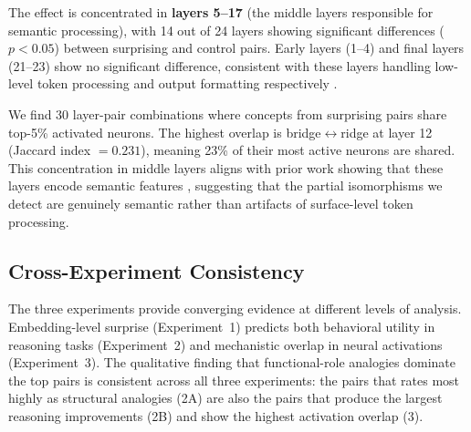 The effect is concentrated in \textbf{layers 5--17} (the middle layers responsible for semantic processing), with 14 out of 24 layers showing significant differences ($p < 0.05$) between surprising and control pairs.
Early layers (1--4) and final layers (21--23) show no significant difference, consistent with these layers handling low-level token processing and output formatting respectively \citep{gurnee2023finding}.

We find 30 layer-pair combinations where concepts from surprising pairs share top-5\% activated neurons.
The highest overlap is bridge$\leftrightarrow$ridge at layer 12 (Jaccard index $= 0.231$), meaning 23\% of their most active neurons are shared.
This concentration in middle layers aligns with prior work showing that these layers encode semantic features \citep{gurnee2023finding}, suggesting that the partial isomorphisms we detect are genuinely semantic rather than artifacts of surface-level token processing.

\subsection{Cross-Experiment Consistency}
\label{sec:cross}

The three experiments provide converging evidence at different levels of analysis.
Embedding-level surprise (Experiment~1) predicts both behavioral utility in reasoning tasks (Experiment~2) and mechanistic overlap in neural activations (Experiment~3).
The qualitative finding that functional-role analogies dominate the top pairs is consistent across all three experiments: the pairs that \gptfour rates most highly as structural analogies (2A) are also the pairs that produce the largest reasoning improvements (2B) and show the highest activation overlap (3).
